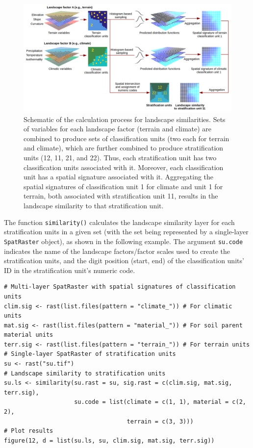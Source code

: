 \begin{figure}[H]

{\centering \includegraphics[width=1\linewidth,height=0.3\textheight]{figures/figure_11} 

}

\caption{Schematic of the calculation process for landscape similarities. Sets of variables for each landscape factor (terrain and climate) are combined to produce sets of classification units (two each for terrain and climate), which are further combined to produce stratification units (12, 11, 21, and 22). Thus, each stratification unit has two classification units associated with it. Moreover, each classification unit has a spatial signature associated with it. Aggregating the spatial signatures of classification unit 1 for climate and unit 1 for terrain, both associated with stratification unit 11, results in the landscape similarity to that stratification unit.}\label{fig:f12}
\end{figure}

The function \texttt{similarity()} calculates the landscape similarity layer for each
stratification units in a given set (with the set being represented by a
single-layer \texttt{SpatRaster} object), as shown in the following example. The
argument \texttt{su.code} indicates the name of the landscape factors/factor scales
used to create the stratification units, and the digit position (start, end) of
the classification units' ID in the stratification unit's numeric code.

\begin{verbatim}
# Multi-layer SpatRaster with spatial signatures of classification units
clim.sig <- rast(list.files(pattern = "climate_")) # For climatic units
mat.sig <- rast(list.files(pattern = "material_")) # For soil parent material units
terr.sig <- rast(list.files(pattern = "terrain_")) # For terrain units
# Single-layer SpatRaster of stratification units
su <- rast("su.tif")
# Landscape similarity to stratification units
su.ls <- similarity(su.rast = su, sig.rast = c(clim.sig, mat.sig, terr.sig),
                    su.code = list(climate = c(1, 1), material = c(2, 2),
                                   terrain = c(3, 3)))
# Plot results
figure(12, d = list(su.ls, su, clim.sig, mat.sig, terr.sig))
\end{verbatim}

